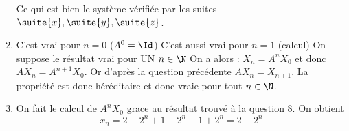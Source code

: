 \documentclass[a4paper, 11pt,reqno]{article}
\begin{document}
\begin{correction}
\begin{enumerate}
 
Ce qui est bien le système vérifiée par les suites $\suite{x}, \suite{y}, \suite{z}$.

\item C'est vrai pour $n=0$ ($A^0=\Id$) C'est aussi vrai pour $n=1$ (calcul) 
On suppose le résultat vrai pour UN $n\in \N$ On a alors :
$X_n = A^nX_0$ et donc $AX_n =A^{n+1}X_0$. Or d'après la question précédente  
$AX_n =X_{n+1}$. La propriété est donc héréditaire et donc vraie pour tout $n\in \N$. 


\item On fait le calcul de $A^n X_0$ grace au résultat trouvé à la question 8. 
On obtient 
$$x_n = 2-2^n +1-2^n -1+2^n = 2-2^n$$

\end{enumerate}
\end{correction}
\end{document}
